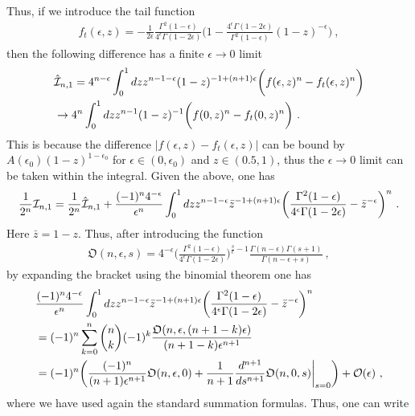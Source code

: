 \documentclass[a4paper,11pt]{article}
\begin{document}
Thus, if we introduce the tail function
\begin{align}
f_{t}(\epsilon,z)=-\frac{1}{2\epsilon}\frac{\Gamma^2(1-\epsilon)}{4^{\epsilon}\Gamma(1-2\epsilon)} \bigg(1-\frac{4^{\epsilon}\Gamma(1-2\epsilon)}{\Gamma^2(1-\epsilon)}(1-z)^{-\epsilon}\bigg) \ ,
\end{align}
then the following difference has a finite $\epsilon\rightarrow0$ limit
\begin{align}
&\hat {\cal I}_{n,1}=4^{n-\epsilon}\int_0^1 dz z^{n-1-\epsilon}(1-z)^{-1+(n+1)\epsilon} \bigg(f(\epsilon,z)^n-f_t(\epsilon,z)^n\bigg) \nonumber \\ 
& \rightarrow 4^n\int_0^1 dz z^{n-1}(1-z)^{-1}\bigg(f(0,z)^n-f_t(0,z)^n\bigg) \ .
\end{align}
This is because the difference $\bigg|f(\epsilon,z)-f_t(\epsilon,z)\bigg|$ can be bound by $A(\epsilon_0)(1-z)^{1-\epsilon_0}$ for $\epsilon \in (0,\epsilon_0)$ and $z\in(0.5,1)$, thus the $\epsilon \rightarrow0$ limit can be taken within the integral. Given the above, one has
\begin{align}
\frac{1}{2^n}{\cal I}_{n,1}=\frac{1}{2^n}\hat{\cal I}_{n,1}+\frac{(-1)^n4^{-\epsilon}}{\epsilon^n}\int_0^1 dz z^{n-1-\epsilon}\bar z^{-1+(n+1)\epsilon}\bigg(\frac{\Gamma^2(1-\epsilon)}{4^{\epsilon}\Gamma(1-2\epsilon)} -\bar z^{-\epsilon}\bigg)^n \ .
\end{align}
Here $\bar z=1-z$. Thus, after introducing the function
\begin{align}
\mathfrak{O}(n,\epsilon,s)=4^{-\epsilon}\bigg(\frac{\Gamma^2(1-\epsilon)}{4^{\epsilon}\Gamma(1-2\epsilon)}\bigg)^{\frac{s}{\epsilon}-1}\frac{\Gamma(n-\epsilon)\Gamma(s+1)}{\Gamma(n-\epsilon+s)} \ ,
\end{align}
by expanding the bracket using the binomial theorem one has
\begin{align}
&\frac{(-1)^n4^{-\epsilon}}{\epsilon^n}\int_0^1 dz z^{n-1-\epsilon}\bar z^{-1+(n+1)\epsilon}\bigg(\frac{\Gamma^2(1-\epsilon)}{4^{\epsilon}\Gamma(1-2\epsilon)} -\bar z^{-\epsilon}\bigg)^n \nonumber \\ 
&=(-1)^n\sum_{k=0}^n\binom{n}{k}(-1)^k\frac{\mathfrak{O}(n,\epsilon,(n+1-k)\epsilon)}{(n+1-k)\epsilon^{n+1}} \nonumber \\ 
&=(-1)^n \bigg(\frac{(-1)^n}{(n+1)\epsilon^{n+1}}\mathfrak{O}(n,\epsilon,0)+\frac{1}{n+1}\frac{d^{n+1}}{ds^{n+1}}\mathfrak{O}(n,0,s)\bigg|_{s=0}\bigg)+{\cal O}(\epsilon) \ ,
\end{align}
where we have used again the standard summation formulas.
Thus, one can write
\end{document}
